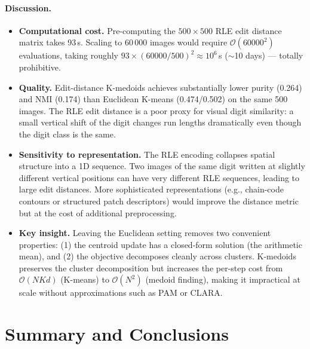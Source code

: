 \documentclass[11pt]{article}
\begin{document}
\paragraph{Discussion.}

\begin{itemize}[itemsep=3pt]
    \item \textbf{Computational cost.}
          Pre-computing the $500 \times 500$ RLE edit distance matrix takes 93\,s.
          Scaling to 60\,000 images would require $\mathcal{O}(60000^2)$
          evaluations, taking roughly $93 \times (60000/500)^2 \approx 10^6$\,s
          ($\sim$10 days) --- totally prohibitive.

    \item \textbf{Quality.}
          Edit-distance K-medoids achieves substantially lower purity (0.264)
          and NMI (0.174) than Euclidean K-means (0.474/0.502) on the same 500
          images.
          The RLE edit distance is a poor proxy for visual digit similarity:
          a small vertical shift of the digit changes run lengths dramatically
          even though the digit class is the same.

    \item \textbf{Sensitivity to representation.}
          The RLE encoding collapses spatial structure into a 1D sequence.
          Two images of the same digit written at slightly different vertical
          positions can have very different RLE sequences, leading to large
          edit distances.
          More sophisticated representations (e.g., chain-code contours or
          structured patch descriptors) would improve the distance metric
          but at the cost of additional preprocessing.

    \item \textbf{Key insight.}
          Leaving the Euclidean setting removes two convenient properties:
          (1) the centroid update has a closed-form solution (the arithmetic mean),
          and (2) the objective decomposes cleanly across clusters.
          K-medoids preserves the cluster decomposition but increases the per-step
          cost from $\mathcal{O}(NK d)$ (K-means) to $\mathcal{O}(N^2)$ (medoid
          finding), making it impractical at scale without approximations
          such as PAM or CLARA.
\end{itemize}

\section{Summary and Conclusions}
\end{document}
